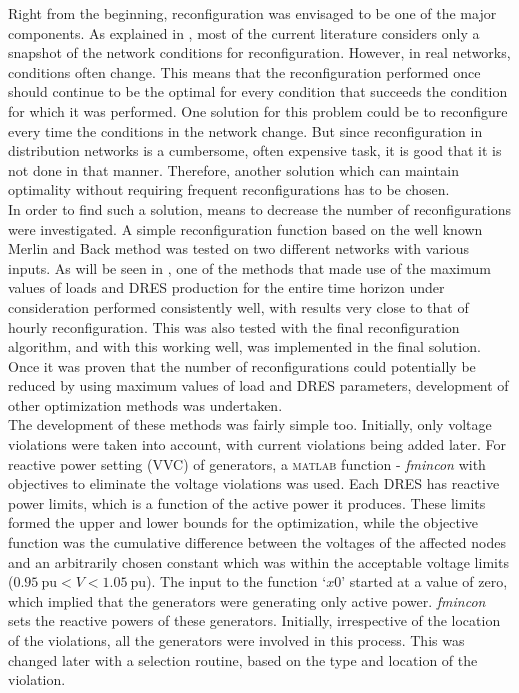Right from the beginning, reconfiguration was envisaged to be one of the major components. As explained in , most of the current literature considers only a snapshot of the network conditions for reconfiguration. However, in real networks, conditions often change. This means that the reconfiguration performed once should continue to be the optimal for every condition that succeeds the condition for which it was performed. One solution for this problem could be to reconfigure every time the conditions in the network change. But since reconfiguration in distribution networks is a cumbersome, often expensive task, it is good that it is not done in that manner. Therefore, another solution which can maintain optimality without requiring frequent reconfigurations has to be chosen.\\

In order to find such a solution, means to decrease the number of reconfigurations were investigated. A simple reconfiguration function based on the well known Merlin and Back method was tested on two different networks with various inputs. As will be seen in , one of the methods that made use of the maximum values of loads and DRES production for the entire time horizon under consideration performed consistently well, with results very close to that of hourly reconfiguration. This was also tested with the final reconfiguration algorithm, and with this working well, was implemented in the final solution. Once it was proven that the number of reconfigurations could potentially be reduced by using maximum values of load and DRES parameters, development of other optimization methods was undertaken.\\

The development of these methods was fairly simple too. Initially, only voltage violations were taken into account, with current violations being added later. For reactive power setting (VVC) of generators, a \textsc{matlab} function - \emph{fmincon} with objectives to eliminate the voltage violations was used. Each DRES has reactive power limits, which is a function of the active power it produces. These limits formed the upper and lower bounds for the optimization, while the objective function was the cumulative difference between the voltages of the affected nodes and an arbitrarily chosen constant which was within the acceptable voltage limits ($0.95\ \mathrm{pu} < V < 1.05\ \mathrm{pu}$). The input to the function `$x0$' started at a value of zero, which implied that the generators were generating only active power. \emph{fmincon} sets the reactive powers of these generators. Initially, irrespective of the location of the violations, all the generators were involved in this process. This was changed later with a selection routine, based on the type and location of the violation.\\


